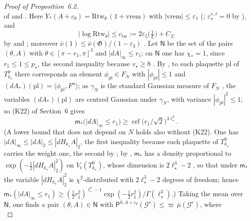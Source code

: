 \documentclass[11pt,letterpaper,reqno]{amsart}
\theoremstyle{definition}
\begin{document}
\begin{proof}[Proof of Proposition~6.2]
\begin{equation*}
\end{equation*}
of \cite[Section~G4.0.6]{QEDIII} and \cite[Definition~5.11]{QEDI}.
Here $Y_*(A+c_\theta)=\mathrm{Rtw}_\theta\,(1+\mathrm{vrem})$ with $|\mathrm{vrem}|\le\varepsilon_1$ (\cite[Proposition~32.1]{QEDIII}; $\varepsilon^{\mathrm v,t}_\star=0$ by \cite[Proposition~28.2]{QEDIII}), and
\begin{equation*}
|\log\mathrm{Rtw}_\theta|\le c_{\mathrm{tw}}:=2\varepsilon_5\bigl(\tfrac1L\bigr)+C_\Sigma
\end{equation*}
by \cite[Proposition~30.3\,(e)]{QEDIII} and \cite[Section~G4.0.2, (Sc3)]{QEDIII};
moreover $\bar\nu(1)\le\bar\nu(\mathfrak G)/(1-\varepsilon_3)$ \cite[Proposition~32.2\,(7.2)]{QEDIII}.
Let $\mathsf N$ be the set of the pairs $(\theta,A)$ with $\theta\in[\pi-r_1,\pi]^3$ and $|dA|_\infty\le r_1$;
on $\mathsf N$ one has $\chi_*=1$, since $r_1\le1\le p_\star$, the second inequality because $v_\star\ge8$ \cite[(fl)]{QEDIII}.
By \cite[Theorem~14.17\,(d)]{QEDI}, to each plaquette $\mathrm{pl}$ of $T^0_{k_\star}$ there corresponds an element $\phi_{\mathrm{pl}}\in F_N$ with $|\phi_{\mathrm{pl}}|\le1$ and $(dA_*)(\mathrm{pl})=\allowbreak \langle\phi_{\mathrm{pl}},\allowbreak F^{\mathrm u}\rangle$;
as $\gamma_N$ is the standard Gaussian measure of $F_N$ \cite[Section~I.7.3]{QEDIII}, the variables $(dA_*)(\mathrm{pl})$ are centred Gaussian under $\gamma_N$, with variance $|\phi_{\mathrm{pl}}|^2\le1$;
so (K22) of Section~6 gives
\begin{equation*}
\mathsf m_*\bigl(|dA|_\infty\le r_1\bigr)\ge\operatorname{erf}\bigl(r_1/\sqrt2\bigr)^{3\ell_\star^3}.
\end{equation*}
(A lower bound that does not depend on $N$ holds also without (K22).
One has $|dA|_\infty\le|dA|_2\le|dH_{k_\star}A|_2$, the first inequality because each plaquette of $T^0_{k_\star}$ carries the weight one, the second by \cite[Proposition~14.8\,(v)]{QEDI};
by \cite[Theorem~14.17\,(e)]{QEDI}, $\mathsf m_*$ has a density proportional to $\exp(-\frac12|dH_{k_\star}A|_2^2)$ on $V_{\mathrm t}(T^0_{k_\star})$, whose dimension is $2\ell_\star^3-2$ \cite[Section~14.1.1]{QEDI}, so that under $\mathsf m_*$ the variable $|dH_{k_\star}A|_2^2$ is $\chi^2$-distributed with $2\ell_\star^3-2$ degrees of freedom;
hence $\mathsf m_*(|dA|_\infty\le r_1)\ge(\frac12r_1^2)^{\ell_\star^3-1}\exp(-\frac12r_1^2)/\Gamma(\ell_\star^3)$.)
Taking the mean over $\mathsf N$, one finds a pair $(\theta,A)\in\mathsf N$ with $\mathsf P^{0,A+c_\theta}(\mathcal G^c)\le\varpi\,\allowbreak \bar\mu(\mathcal G^c)$, where
\begin{equation*}

\end{equation*}
\end{proof}
\end{document}
